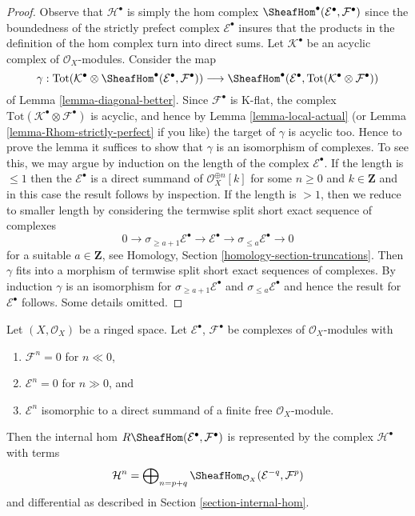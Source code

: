 \begin{proof}
Observe that $\mathcal{H}^\bullet$ is simply the hom complex
$\SheafHom^\bullet(\mathcal{E}^\bullet, \mathcal{F}^\bullet)$
since the boundedness of the strictly prefect complex
$\mathcal{E}^\bullet$ insures that the products in the definition
of the hom complex turn into direct sums.
Let $\mathcal{K}^\bullet$ be an acyclic complex of
$\mathcal{O}_X$-modules. Consider the map
$$
\gamma :
\text{Tot}(\mathcal{K}^\bullet \otimes
\SheafHom^\bullet(\mathcal{E}^\bullet, \mathcal{F}^\bullet))
\longrightarrow
\SheafHom^\bullet(\mathcal{E}^\bullet,
\text{Tot}(\mathcal{K}^\bullet \otimes \mathcal{F}^\bullet))
$$
of Lemma \ref{lemma-diagonal-better}. Since $\mathcal{F}^\bullet$ is K-flat,
the complex $\text{Tot}(\mathcal{K}^\bullet \otimes \mathcal{F}^\bullet)$
is acyclic, and hence by Lemma \ref{lemma-local-actual}
(or Lemma \ref{lemma-Rhom-strictly-perfect} if you like)
the target of $\gamma$ is acyclic too. Hence to prove the lemma it suffices to
show that $\gamma$ is an isomorphism of complexes. To see this, we may argue
by induction on the length of the complex $\mathcal{E}^\bullet$.
If the length is $\leq 1$ then the $\mathcal{E}^\bullet$
is a direct summand of $\mathcal{O}_X^{\oplus n}[k]$ for some
$n \geq 0$ and $k \in \mathbf{Z}$ and in this case the result
follows by inspection. If the length is $> 1$, then we reduce
to smaller length by considering the termwise split short exact
sequence of complexes
$$
0 \to \sigma_{\geq a + 1} \mathcal{E}^\bullet \to
\mathcal{E}^\bullet \to
\sigma_{\leq a} \mathcal{E}^\bullet \to 0
$$
for a suitable $a \in \mathbf{Z}$, see
Homology, Section \ref{homology-section-truncations}.
Then $\gamma$ fits into a morphism of termwise split
short exact sequences of complexes.
By induction $\gamma$ is an isomorphism for
$\sigma_{\geq a + 1} \mathcal{E}^\bullet$
and $\sigma_{\leq a} \mathcal{E}^\bullet$ and hence the result for
$\mathcal{E}^\bullet$ follows. Some details omitted.
\end{proof}

\begin{lemma}
\label{lemma-Rhom-complex-of-direct-summands-finite-free}
Let $(X, \mathcal{O}_X)$ be a ringed space.
Let $\mathcal{E}^\bullet$, $\mathcal{F}^\bullet$ be complexes
of $\mathcal{O}_X$-modules with
\begin{enumerate}
\item $\mathcal{F}^n = 0$ for $n \ll 0$,
\item $\mathcal{E}^n = 0$ for $n \gg 0$, and
\item $\mathcal{E}^n$ isomorphic to a direct summand of a finite
free $\mathcal{O}_X$-module.
\end{enumerate}
Then the internal hom $R\SheafHom(\mathcal{E}^\bullet, \mathcal{F}^\bullet)$
is represented by the complex $\mathcal{H}^\bullet$ with terms
$$
\mathcal{H}^n =
\bigoplus\nolimits_{n = p + q}
\SheafHom_{\mathcal{O}_X}(\mathcal{E}^{-q}, \mathcal{F}^p)
$$
and differential as described in Section \ref{section-internal-hom}.
\end{lemma}

